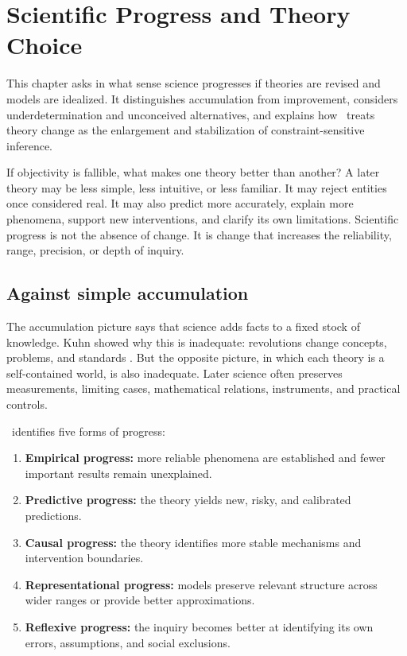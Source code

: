 \chapter{Scientific Progress and Theory Choice}
\label{ch:progress}

\begin{chapterguide}
This chapter asks in what sense science progresses if theories are revised and
models are idealized. It distinguishes accumulation from improvement, considers
underdetermination and unconceived alternatives, and explains how \RCR\ treats
theory change as the enlargement and stabilization of constraint-sensitive
inference.
\end{chapterguide}

If objectivity is fallible, what makes one theory better than another? A later
theory may be less simple, less intuitive, or less familiar. It may reject
entities once considered real. It may also predict more accurately, explain
more phenomena, support new interventions, and clarify its own limitations.
Scientific progress is not the absence of change. It is change that increases
the reliability, range, precision, or depth of inquiry.

\section{Against simple accumulation}

The accumulation picture says that science adds facts to a fixed stock of
knowledge. Kuhn showed why this is inadequate: revolutions change concepts,
problems, and standards \citep{kuhn1962}. But the opposite picture, in which
each theory is a self-contained world, is also inadequate. Later science often
preserves measurements, limiting cases, mathematical relations, instruments,
and practical controls.

\RCR\ identifies five forms of progress:

\begin{enumerate}
\item \textbf{Empirical progress:} more reliable phenomena are established and
fewer important results remain unexplained.
\item \textbf{Predictive progress:} the theory yields new, risky, and calibrated
predictions.
\item \textbf{Causal progress:} the theory identifies more stable mechanisms
and intervention boundaries.
\item \textbf{Representational progress:} models preserve relevant structure
across wider ranges or provide better approximations.
\item \textbf{Reflexive progress:} the inquiry becomes better at identifying
its own errors, assumptions, and social exclusions.
\end{enumerate}

